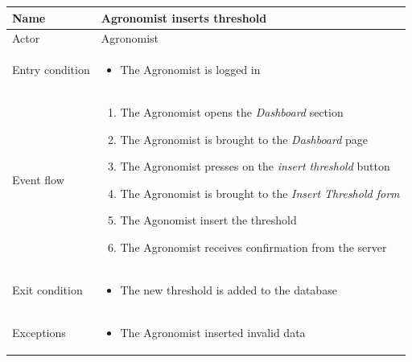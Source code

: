 \begin{table}[H]
    \begin{tabu} to \textwidth {|X|X[4]|}
        \hline
        Name            & Agronomist inserts threshold  \\ \hline
        Actor           & Agronomist                     \\ \hline
        Entry condition & \begin{itemize}
            \item The Agronomist is logged in
        \end{itemize} \\ \hline
        Event flow      & \begin{enumerate}
            \item The Agronomist opens the \emph{Dashboard} section
            \item The Agronomist is brought to the \emph{Dashboard} page 
            \item The Agronomist presses on the \emph{insert threshold} button
            \item The Agronomist is brought to the \emph{Insert Threshold form}
            \item The Agonomist insert the threshold
            \item The Agronomist receives confirmation from the server
        \end{enumerate} \\ \hline
        Exit condition  & \begin{itemize}
            \item The new threshold is added to the database
        \end{itemize} \\ \hline
        Exceptions      & \begin{itemize}
            \item The Agronomist inserted invalid data
        \end{itemize} \\ \hline
    \end{tabu}
\end{table}


